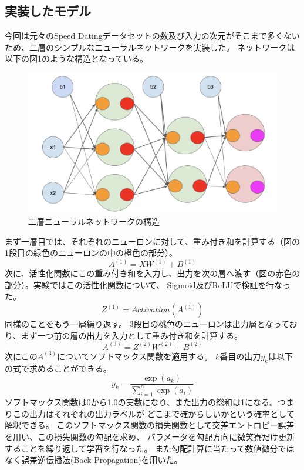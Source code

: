 \documentclass[uplatex]{jsarticle}
\begin{document}
\subsection{実装したモデル}
今回は元々のSpeed Datingデータセットの数及び入力の次元がそこまで多くないため、二層のシンプルなニューラルネットワークを実装した。
ネットワークは以下の図1のような構造となっている。
\begin{figure}
  \begin{center}
    \includegraphics[width=13cm]{img/model.png}
    \caption{二層ニューラルネットワークの構造}
  \end{center}
\end{figure}
まず一層目では、それぞれのニューロンに対して、重み付き和を計算する（図の1段目の緑色のニューロンの中の橙色の部分）。
$$A ^ {(1)} = XW^{(1)} + B^{(1)}$$
次に、活性化関数にこの重み付き和を入力し、出力を次の層へ渡す（図の赤色の部分）。実験ではこの活性化関数について、
Sigmoid及びReLUで検証を行なった。
$$Z ^ {(1)} = Activation(A ^ {(1)})$$
同様のことをもう一層繰り返す。
3段目の桃色のニューロンは出力層となっており、まず一つ前の層の出力を入力として重み付き和を計算する。
$$A ^ {(3)} = Z^{(2)}W^{(2)} + B^{(2)}$$
次にこの$A ^ {(3)}$についてソフトマックス関数を適用する。
$k$番目の出力$y_k$は以下の式で求めることができる。
$$y_k = \frac{\exp{(a_k)}}{\sum_{i=1}^n\exp{(a_i)}}$$
ソフトマックス関数は0から1.0の実数になり、また出力の総和は1になる。つまりこの出力はそれぞれの出力ラベルが
どこまで確からしいかという確率として解釈できる。
このソフトマックス関数の損失関数として交差エントロピー誤差を用い、この損失関数の勾配を求め、
パラメータを勾配方向に微笑寮だけ更新することを繰り返して学習を行なった。
また勾配計算に当たって数値微分ではなく誤差逆伝播法(Back Propagation)を用いた。
\end{document}
